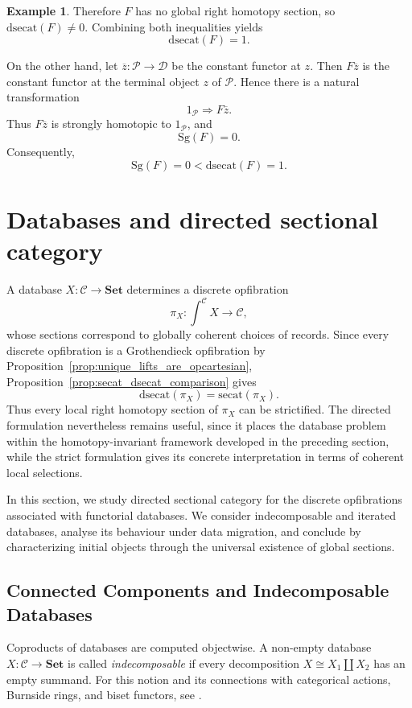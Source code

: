 \documentclass[12pt]{amsart}
\theoremstyle{definition}
\newtheorem{example}[teo]{Example}
\theoremstyle{remark}
\numberwithin{figure}{section}%
\newcommand{\CC}{\mathcal{C}}
\newcommand{\Dc}{\mathcal{D}}
\newcommand{\Sets}{\mathbf{Set}}
\begin{document}
\begin{example}
Therefore \(F\) has no global right homotopy section, so
\(\mathrm{dsecat}(F)\neq0\). Combining both inequalities yields
\[
\mathrm{dsecat}(F)=1.
\]

On the other hand, let
\(\overline z\colon\mathcal P\to\Dc\) be the constant functor at \(z\).
Then \(F\overline z\) is the constant functor at the terminal object \(z\)
of \(\mathcal P\). Hence there is a natural transformation
\[
1_{\mathcal P}\Rightarrow F\overline z.
\]
Thus \(F\overline z\) is strongly homotopic to \(1_{\mathcal P}\), and
\[
\mathrm{Sg}(F)=0.
\]
Consequently,
\[
\mathrm{Sg}(F)=0
<
\mathrm{dsecat}(F)=1.
\]
\end{example}

\section{Databases and directed sectional category}\label{sec:databases_sectional}

A database \(X\colon\CC\to\Sets\) determines a discrete opfibration
\[
\pi_X\colon\int^\CC X\longrightarrow\CC,
\]
whose sections correspond to globally coherent choices of records. Since
every discrete opfibration is a Grothendieck opfibration by
Proposition~\ref{prop:unique_lifts_are_opcartesian},
Proposition~\ref{prop:secat_dsecat_comparison} gives
\[
\mathrm{dsecat}(\pi_X)=\mathrm{secat}(\pi_X).
\]
Thus every local right homotopy section of \(\pi_X\) can be strictified.
The directed formulation nevertheless remains useful, since it places the
database problem within the homotopy-invariant framework developed in the
preceding section, while the strict formulation gives its concrete
interpretation in terms of coherent local selections.

In this section, we study directed sectional category for the discrete
opfibrations associated with functorial databases. We consider
indecomposable and iterated databases, analyse its behaviour under data
migration, and conclude by characterizing initial objects through the
universal existence of global sections.

\subsection{Connected Components and Indecomposable Databases}
\label{subsec:indecomposable_databases}

Coproducts of databases are computed objectwise. A non-empty database
\(X\colon\CC\to\Sets\) is called \emph{indecomposable} if every
decomposition \(X\cong X_1\coprod X_2\) has an empty summand. For this
notion and its connections with categorical actions, Burnside rings, and
biset functors, see \cite{webb2023bisetfunctorscategories}.
\end{document}
